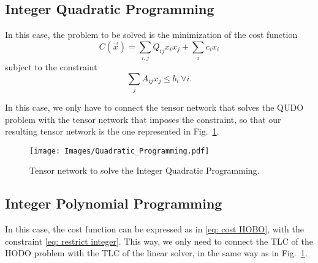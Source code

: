 \subsection{Integer Quadratic Programming}
In this case, the problem to be solved is the minimization of the cost function
\begin{equation}
    C(\vec{x}) = \sum_{i,j} Q_{ij} x_ix_j + \sum_i c_i x_i
\end{equation}
subject to the constraint
\begin{equation}\label{eq: restrict integer}
    \sum_{j} A_{ij}  x_j \leq b_i \ \forall i.
\end{equation}

In this case, we only have to connect the tensor network that solves the QUDO problem with the tensor network that imposes the constraint, so that our resulting tensor network is the one represented in Fig.~\ref{fig: IQP}.

\begin{figure}[h]
    \centering
    \texttt{[image: Images/Quadratic\_Programming.pdf]}
    \caption{Tensor network to solve the Integer Quadratic Programming.}
    \label{fig: IQP}
\end{figure}

\subsection{Integer Polynomial Programming}
In this case, the cost function can be expressed as in \ref{eq: cost HOBO}, with the constraint \ref{eq: restrict integer}. This way, we only need to connect the TLC of the HODO problem with the TLC of the linear solver, in the same way as in Fig.~\ref{fig: IQP}.


